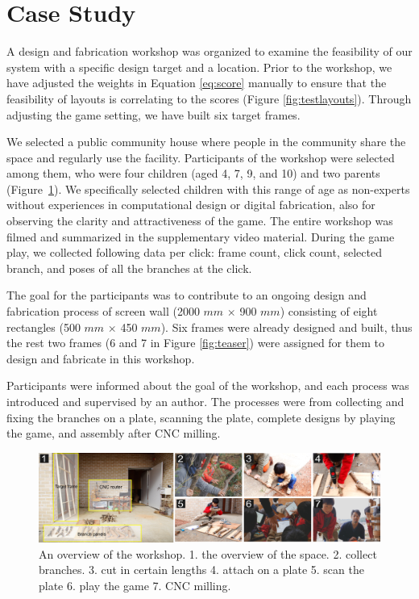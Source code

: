 \section{Case Study}
\label{sec:casestudy}
A design and fabrication workshop was organized to examine the feasibility of our system with a specific design target and a location.
Prior to the workshop, we have adjusted the weights in Equation \ref{eq:score} manually to ensure that the feasibility of layouts is correlating to the scores (Figure \ref{fig:testlayouts}).
Through adjusting the game setting, we have built six target frames.


We selected a public community house where people in the community share the space and regularly use the facility.
Participants of the workshop were selected among them, who were four children (aged 4, 7, 9, and 10) and two parents (Figure~\ref{fig:workshop}).
We specifically selected children with this range of age as non-experts without experiences in computational design or digital fabrication, also for observing the clarity and attractiveness of the game.
The entire workshop was filmed and summarized in the supplementary video material.
During the game play, we collected following data per click: frame count, click count, selected branch, and poses of all the branches at the click.


The goal for the participants was to contribute to an ongoing design and fabrication process of screen wall (2000 $mm$ $\times$ 900 $mm$) consisting of eight rectangles (500 $mm$ $\times$ 450 $mm$).
Six frames were already designed and built, thus the rest two frames (6 and 7 in Figure \ref{fig:teaser}) were assigned for them to design and fabricate in this workshop.

Participants were informed about the goal of the workshop, and each process was introduced and supervised by an author.
The processes were from collecting and fixing the branches on a plate, scanning the plate, complete designs by playing the game, and assembly after CNC milling.

\begin{figure}[ht]
  \begin{center}
    \includegraphics[width = 0.4\paperwidth]{images/fabrication/workshop_setup.png}
    \caption{An overview of the workshop. 1. the overview of the space. 2. collect branches. 3. cut in certain lengths 4. attach on a plate 5. scan the plate 6. play the game 7. CNC milling.}
    \label{fig:workshop}
  \end{center}
\end{figure}

